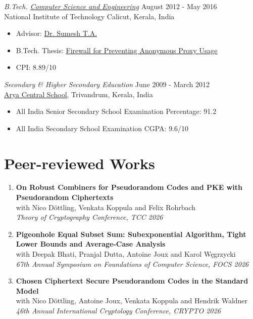 \documentclass[margin]{res} %
\begin{document}
\begin{resume}
{\sl B.Tech. \href{https://nitc.ac.in/department/computer-science-amp-engineering}{Computer Science and Engineering}} \hfill August 2012 - May 2016 \\
National Institute of Technology Calicut, Kerala, India
\begin{itemize}
\item Advisor: \href{https://nitc.ac.in/department/computer-science-amp-engineering/faculty-and-staff/faculty/a8fddc9d-779e-4109-9846-3e0198986145}{Dr. Sumesh T.A.}
\item B.Tech. Thesis: \href{https://mahe94.github.io/assets/bibliography/btech_thesis.pdf}{Firewall for Preventing Anonymous Proxy Usage}
\item CPI: 8.89/10
\end{itemize} 

{\sl Secondary \& Higher Secondary Education} \hfill June 2009 - March 2012 \\
\href{https://www.aryacentralschool.org}{Arya Central School}, Trivandrum, Kerala, India
\begin{itemize}
    \item All India Senior Secondary School Examination \qquad Percentage:  91.2
    \item All India Secondary School Examination  \qquad CGPA: 9.6/10
\end{itemize}



\section{Peer-reviewed Works}
\begin{enumerate}

\item \textbf{On Robust Combiners for Pseudorandom Codes and PKE with Pseudorandom Ciphertexts}\\
with Nico Döttling, Venkata Koppula and Felix Rohrbach\\
\emph{Theory of Cryptography Conference, TCC 2026}

\item \textbf{Pigeonhole Equal Subset Sum: Subexponential Algorithm, Tight Lower Bounds and Average-Case Analysis}\\
with Deepak Bhati, Pranjal Dutta, Antoine Joux and Karol W\k{e}grzycki\\
\emph{67th Annual Symposium on Foundations of Computer Science, FOCS 2026}

\item \textbf{Chosen Ciphertext Secure Pseudorandom Codes in the Standard Model}\\
with Nico Döttling, Antoine Joux, Venkata Koppula and Hendrik Waldner\\
\emph{46th Annual International Cryptology Conference, CRYPTO 2026}


\end{enumerate}
\end{resume}
\end{document}
